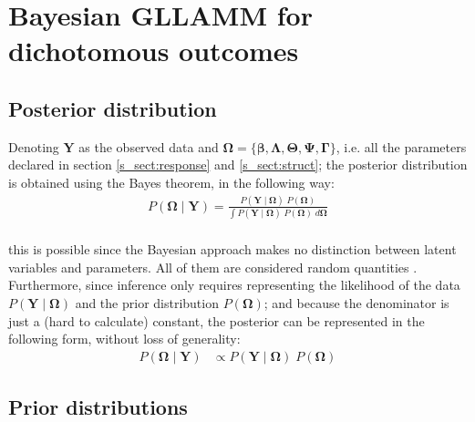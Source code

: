 
\section{Bayesian GLLAMM for dichotomous outcomes} \label{sect:model}

\subsection{Posterior distribution}

Denoting $\mathbf{Y}$ as the observed data and $\pmb{\Omega} = \{ \pmb{\beta}, \pmb{\Lambda}, \pmb{\Theta}, \pmb{\Psi}, \pmb{\Gamma} \}$, i.e. all the parameters declared in section \ref{s_sect:response} and \ref{s_sect:struct}; the posterior distribution is obtained using the Bayes theorem, in the following way:
%
\begin{equation} \label{eq:posterior1}
	\begin{split}
		P(\pmb{\Omega} \; | \; \mathbf{Y}) = \frac{ P( \mathbf{Y} \; | \; \pmb{\Omega} ) \; P( \pmb{\Omega} ) }{ \int P( \mathbf{Y} \; | \; \pmb{\Omega} ) \; P( \pmb{\Omega} ) \; d\pmb{\Omega} } \\
	\end{split}
\end{equation}

\noindent this is possible since the Bayesian approach makes no distinction between latent variables and parameters. All of them are considered random quantities \cite{Skrondal_et_al_2004a}. Furthermore, since inference only requires representing the likelihood of the data $P( \mathbf{Y} \; | \; \pmb{\Omega} )$ and the prior distribution $P( \pmb{\Omega} )$; and because the denominator is just a (hard to calculate) constant, the posterior can be represented in the following form, without loss of generality:
%
\begin{equation} \label{eq:posterior2}
	\begin{split}
		P(\pmb{\Omega} \; | \; \mathbf{Y}) &\propto P( \mathbf{Y} \; | \; \pmb{\Omega} ) \; P( \pmb{\Omega} )
	\end{split}
\end{equation}


\subsection{Prior distributions}

